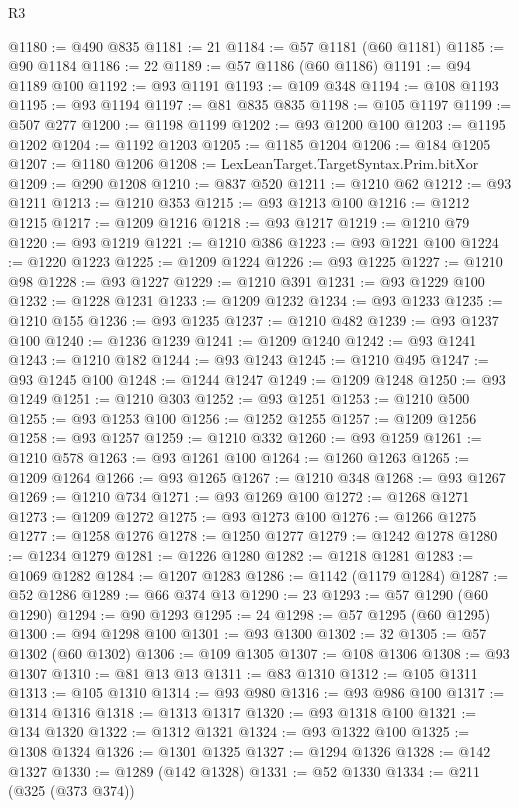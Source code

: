 \begin{lexlean}{R3}
\begin{coremodule}
@1180 := @490 @835
@1181 := 21
@1184 := @57 @1181 (@60 @1181)
@1185 := @90 @1184
@1186 := 22
@1189 := @57 @1186 (@60 @1186)
@1191 := @94 @1189 @100
@1192 := @93 @1191
@1193 := @109 @348
@1194 := @108 @1193
@1195 := @93 @1194
@1197 := @81 @835 @835
@1198 := @105 @1197
@1199 := @507 @277
@1200 := @1198 @1199
@1202 := @93 @1200 @100
@1203 := @1195 @1202
@1204 := @1192 @1203
@1205 := @1185 @1204
@1206 := @184 @1205
@1207 := @1180 @1206
@1208 := LexLeanTarget.TargetSyntax.Prim.bitXor
@1209 := @290 @1208
@1210 := @837 @520
@1211 := @1210 @62
@1212 := @93 @1211
@1213 := @1210 @353
@1215 := @93 @1213 @100
@1216 := @1212 @1215
@1217 := @1209 @1216
@1218 := @93 @1217
@1219 := @1210 @79
@1220 := @93 @1219
@1221 := @1210 @386
@1223 := @93 @1221 @100
@1224 := @1220 @1223
@1225 := @1209 @1224
@1226 := @93 @1225
@1227 := @1210 @98
@1228 := @93 @1227
@1229 := @1210 @391
@1231 := @93 @1229 @100
@1232 := @1228 @1231
@1233 := @1209 @1232
@1234 := @93 @1233
@1235 := @1210 @155
@1236 := @93 @1235
@1237 := @1210 @482
@1239 := @93 @1237 @100
@1240 := @1236 @1239
@1241 := @1209 @1240
@1242 := @93 @1241
@1243 := @1210 @182
@1244 := @93 @1243
@1245 := @1210 @495
@1247 := @93 @1245 @100
@1248 := @1244 @1247
@1249 := @1209 @1248
@1250 := @93 @1249
@1251 := @1210 @303
@1252 := @93 @1251
@1253 := @1210 @500
@1255 := @93 @1253 @100
@1256 := @1252 @1255
@1257 := @1209 @1256
@1258 := @93 @1257
@1259 := @1210 @332
@1260 := @93 @1259
@1261 := @1210 @578
@1263 := @93 @1261 @100
@1264 := @1260 @1263
@1265 := @1209 @1264
@1266 := @93 @1265
@1267 := @1210 @348
@1268 := @93 @1267
@1269 := @1210 @734
@1271 := @93 @1269 @100
@1272 := @1268 @1271
@1273 := @1209 @1272
@1275 := @93 @1273 @100
@1276 := @1266 @1275
@1277 := @1258 @1276
@1278 := @1250 @1277
@1279 := @1242 @1278
@1280 := @1234 @1279
@1281 := @1226 @1280
@1282 := @1218 @1281
@1283 := @1069 @1282
@1284 := @1207 @1283
@1286 := @1142 (@1179 @1284)
@1287 := @52 @1286
@1289 := @66 @374 @13
@1290 := 23
@1293 := @57 @1290 (@60 @1290)
@1294 := @90 @1293
@1295 := 24
@1298 := @57 @1295 (@60 @1295)
@1300 := @94 @1298 @100
@1301 := @93 @1300
@1302 := 32
@1305 := @57 @1302 (@60 @1302)
@1306 := @109 @1305
@1307 := @108 @1306
@1308 := @93 @1307
@1310 := @81 @13 @13
@1311 := @83 @1310
@1312 := @105 @1311
@1313 := @105 @1310
@1314 := @93 @980
@1316 := @93 @986 @100
@1317 := @1314 @1316
@1318 := @1313 @1317
@1320 := @93 @1318 @100
@1321 := @134 @1320
@1322 := @1312 @1321
@1324 := @93 @1322 @100
@1325 := @1308 @1324
@1326 := @1301 @1325
@1327 := @1294 @1326
@1328 := @142 @1327
@1330 := @1289 (@142 @1328)
@1331 := @52 @1330
@1334 := @211 (@325 (@373 @374))

\end{coremodule}
\end{lexlean}

